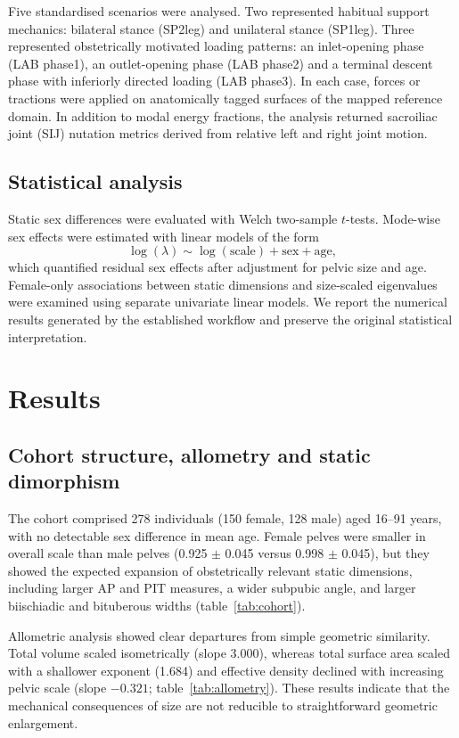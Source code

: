 \documentclass[11pt,a4paper]{article}
\begin{document}
Five standardised scenarios were analysed. Two represented habitual support mechanics: bilateral stance (SP2leg) and unilateral stance (SP1leg). Three represented obstetrically motivated loading patterns: an inlet-opening phase (LAB phase1), an outlet-opening phase (LAB phase2) and a terminal descent phase with inferiorly directed loading (LAB phase3). In each case, forces or tractions were applied on anatomically tagged surfaces of the mapped reference domain. In addition to modal energy fractions, the analysis returned sacroiliac joint (SIJ) nutation metrics derived from relative left and right joint motion.

\subsection{Statistical analysis}

Static sex differences were evaluated with Welch two-sample $t$-tests. Mode-wise sex effects were estimated with linear models of the form
\begin{equation}
\log(\lambda) \sim \log(\mathrm{scale}) + \mathrm{sex} + \mathrm{age},
\end{equation}
which quantified residual sex effects after adjustment for pelvic size and age. Female-only associations between static dimensions and size-scaled eigenvalues were examined using separate univariate linear models. We report the numerical results generated by the established workflow and preserve the original statistical interpretation.

\section{Results}

\subsection{Cohort structure, allometry and static dimorphism}

The cohort comprised 278 individuals (150 female, 128 male) aged 16--91 years, with no detectable sex difference in mean age. Female pelves were smaller in overall scale than male pelves (0.925 $\pm$ 0.045 versus 0.998 $\pm$ 0.045), but they showed the expected expansion of obstetrically relevant static dimensions, including larger AP and PIT measures, a wider subpubic angle, and larger biischiadic and bituberous widths (table~\ref{tab:cohort}).

Allometric analysis showed clear departures from simple geometric similarity. Total volume scaled isometrically (slope 3.000), whereas total surface area scaled with a shallower exponent (1.684) and effective density declined with increasing pelvic scale (slope $-0.321$; table~\ref{tab:allometry}). These results indicate that the mechanical consequences of size are not reducible to straightforward geometric enlargement.
\end{document}
